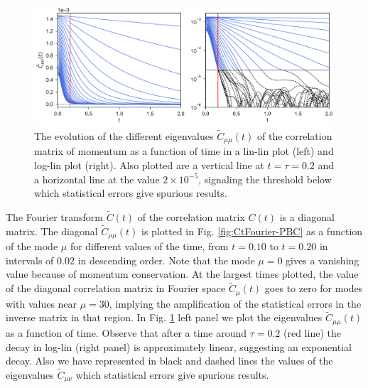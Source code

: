 \documentclass[a4paper,openright,12pt]{book}
\begin{document}
\begin{figure}[h!]
  \centering
  \includegraphics[scale=0.45]{CtFourier-PBC-exp}
  \caption[Evolution of different eigenvalues $\tilde{C}_{\mu\nu}(t)$ for PBC]{
  The  evolution of  the different
  eigenvalues  $\tilde{C}_{\mu\mu}(t)$ of  the  correlation matrix  of
  momentum  as  a  function  of   time  in  a  lin-lin  plot  (left)
  and   log-lin   plot
  (right). Also  plotted are  a vertical line  at $t=\tau=0.2$  and a
  horizontal  line  at  the   value  $2\times10^{-5}$,  signaling  the
  threshold below which statistical errors give spurious results. }
\label{fig:CtFourier-PBC-exp}
\end{figure}

The Fourier transform $\tilde{C}(t)$  of the correlation matrix $C(t)$
is a diagonal matrix.  The diagonal $\tilde{C}_{\mu\mu}(t)$ is plotted
in Fig.   \ref{fig:CtFourier-PBC} as a function of the mode
$\mu$      for      different       values      of      the      time,
from $t=0.10$ to $t=0.20$ in intervals of $0.02$ in  descending   order.   Note that the  mode
$\mu=0$ gives a vanishing value  because of momentum conservation. At the largest times plotted,
the  value  of  the  diagonal  correlation  matrix  in  Fourier  space
$\tilde{C}_\mu(t)$ goes to  zero for modes with  values near $\mu=30$,
implying the  amplification of the  statistical errors in  the inverse
matrix in that  region.  In Fig.  \ref{fig:CtFourier-PBC-exp}  left panel we
plot the  eigenvalues $\tilde{C}_{\mu\mu}(t)$  as a function  of time.
Observe  that after  a time  around  $\tau=0.2$ (red line) the  decay in  log-lin
(right  panel) is  approximately  linear,  suggesting an  exponential
decay. Also we have represented in black and dashed lines the values of the eigenvalues $\tilde{C}_{\mu\nu}$ which statistical errors give spurious results. 
\end{document}
